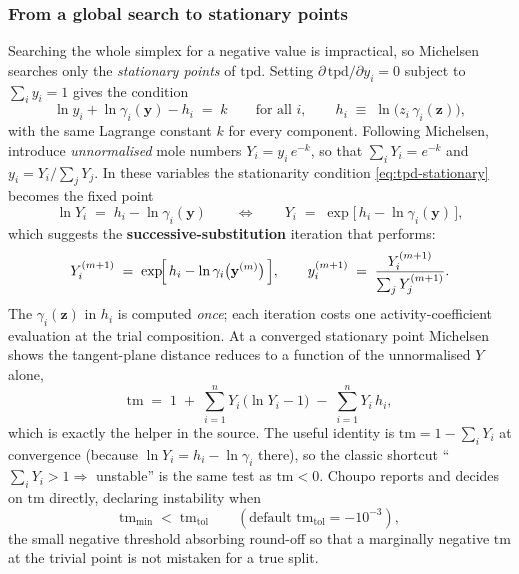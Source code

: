 \documentclass[11pt,a4paper]{article}
\newcommand{\yv}{\mathbf{y}}
\newcommand{\zv}{\mathbf{z}}
\begin{document}
\subsubsection*{From a global search to stationary points}

Searching the whole simplex for a negative value is impractical, so
Michelsen searches only the \emph{stationary points} of
$\mathrm{tpd}$.  Setting $\partial\,\mathrm{tpd}/\partial y_i = 0$
subject to $\sum_i y_i = 1$ gives the condition
\begin{equation}
  \ln y_i + \ln\gamma_i(\yv) - h_i \;=\; k
  \qquad\text{for all } i,
  \qquad
  h_i \;\equiv\; \ln\!\bigl(z_i\,\gamma_i(\zv)\bigr),
  \label{eq:tpd-stationary}
\end{equation}
with the same Lagrange constant $k$ for every component.  Following
Michelsen, introduce \emph{unnormalised} mole numbers
$Y_i = y_i\,e^{-k}$, so that $\sum_i Y_i = e^{-k}$ and
$y_i = Y_i/\sum_j Y_j$.  In these variables the stationarity condition
\eqref{eq:tpd-stationary} becomes the fixed point
\begin{equation}
  \ln Y_i \;=\; h_i - \ln\gamma_i(\yv)
  \qquad\Longleftrightarrow\qquad
  Y_i \;=\; \exp\!\bigl[\,h_i - \ln\gamma_i(\yv)\,\bigr],
  \label{eq:tpd-fixedpoint}
\end{equation}
which suggests the \textbf{successive-substitution} iteration that
 performs:
\begin{equation}
  Y_i^{(m+1)} \;=\;
    \exp\!\Bigl[\,h_i - \ln\gamma_i\bigl(\yv^{(m)}\bigr)\,\Bigr],
  \qquad
  y_i^{(m+1)} \;=\; \frac{Y_i^{(m+1)}}{\sum_j Y_j^{(m+1)}}.
  \label{eq:tpd-ss}
\end{equation}
The $\gamma_i(\zv)$ in $h_i$ is computed \emph{once}; each iteration
costs one activity-coefficient evaluation at the trial composition.
At a converged stationary point Michelsen shows the tangent-plane
distance reduces to a function of the unnormalised $Y$ alone,
\begin{equation}
  \mathrm{tm} \;=\; 1 \;+\; \sum_{i=1}^{n}
      Y_i\,\bigl(\ln Y_i - 1\bigr) \;-\; \sum_{i=1}^{n} Y_i\,h_i ,
  \label{eq:tpd-tm}
\end{equation}
which is exactly the  helper in the source.  The useful
identity is $\mathrm{tm} = 1 - \sum_i Y_i$ at convergence (because
$\ln Y_i = h_i - \ln\gamma_i$ there), so the classic shortcut
``$\sum_i Y_i > 1 \Rightarrow$ unstable'' is the same test as
$\mathrm{tm} < 0$.  Choupo reports and decides on $\mathrm{tm}$
directly, declaring instability when
\begin{equation}
  \mathrm{tm}_{\min} \;<\; \mathrm{tm}_{\mathrm{tol}}
  \qquad (\text{default } \mathrm{tm}_{\mathrm{tol}} = -10^{-3}),
  \label{eq:tpd-decision}
\end{equation}
the small negative threshold absorbing round-off so that a marginally
negative $\mathrm{tm}$ at the trivial point is not mistaken for a true
split.
\end{document}
